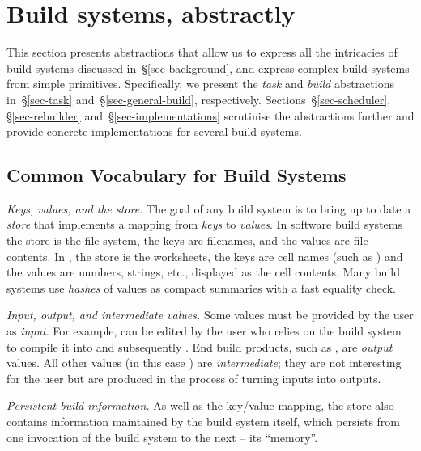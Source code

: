 \section{Build systems, abstractly}\label{sec-abstractions}

This section presents abstractions that allow us to express
all the intricacies of build systems discussed in~\S\ref{sec-background},
and express complex build systems from simple primitives. Specifically, we
present the \emph{task} and \emph{build} abstractions in~\S\ref{sec-task}
and~\S\ref{sec-general-build}, respectively. Sections~\S\ref{sec-scheduler},
\S\ref{sec-rebuilder} and~\S\ref{sec-implementations} scrutinise the
abstractions further and provide concrete implementations for several build
systems.

\vspace{-1.5mm}
\subsection{Common Vocabulary for Build Systems}\label{sec-vocabulary}
\vspace{-0.5mm}

\emph{Keys, values, and the store.} The goal of any build system is to
bring up to date a \emph{store} that implements a mapping from \emph{keys} to
\emph{values}. In software build systems the store is the file system, the
keys are filenames, and the values are file contents. In \Excel, the store is
the worksheets, the keys are cell names (such as ) and the values are
numbers, strings, etc., displayed as the cell contents. Many build systems use
\emph{hashes} of values as compact summaries with a fast equality check.

\emph{Input, output, and intermediate values.} Some values must be provided by
the user as \emph{input}. For example,  can be edited by the user
who relies on the build system to compile it into  and subsequently
. End build products, such as , are \emph{output}
values. All other values (in this case ) are \emph{intermediate};
they are not interesting for the user but are produced in the process of turning
inputs into outputs.

\emph{Persistent build information.} As well as the key/value mapping, the
store also contains information maintained by the build system itself, which
persists from one invocation of the build system to the next -- its ``memory''.


